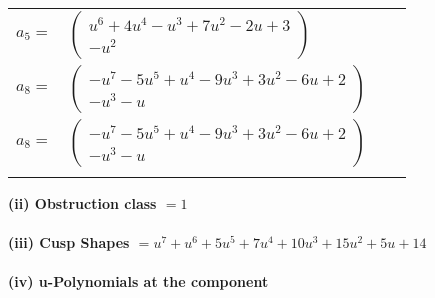 \documentclass[1p]{elsarticle_modified}
\theoremstyle{definition}
\begin{document}
\begin{tabular}{m{7pt} m{180pt} m{7pt} m{180pt} }
\flushright $a_{5}=$&$\begin{pmatrix}u^6+4 u^4- u^3+7 u^2-2 u+3\\- u^2\end{pmatrix}$ \\
\flushright $a_{8}=$&$\begin{pmatrix}- u^7-5 u^5+u^4-9 u^3+3 u^2-6 u+2\\- u^3- u\end{pmatrix}$\\ \flushright $a_{8}=$&$\begin{pmatrix}- u^7-5 u^5+u^4-9 u^3+3 u^2-6 u+2\\- u^3- u\end{pmatrix}$\\&\end{tabular}
\flushleft \textbf{(ii) Obstruction class $= 1$}\\~\\
\flushleft \textbf{(iii) Cusp Shapes $= u^7+u^6+5 u^5+7 u^4+10 u^3+15 u^2+5 u+14$}\\~\\
\newpage\renewcommand{\arraystretch}{1}
\flushleft \textbf{(iv) u-Polynomials at the component}\newline \\
\end{document}
